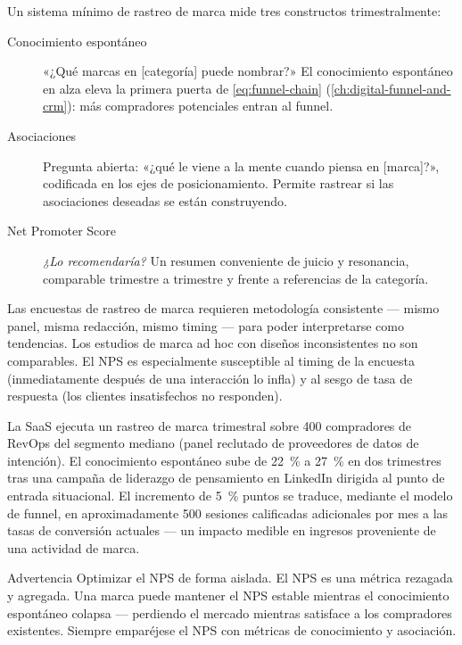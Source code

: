 Un sistema mínimo de rastreo de marca mide tres constructos trimestralmente:

\begin{description}
  \item[Conocimiento espontáneo] «¿Qué marcas en [categoría] puede nombrar?» El conocimiento espontáneo en alza eleva la primera puerta de \cref{eq:funnel-chain} (\cref{ch:digital-funnel-and-crm}): más compradores potenciales entran al funnel.
  \item[Asociaciones] Pregunta abierta: «¿qué le viene a la mente cuando piensa en [marca]?», codificada en los ejes de posicionamiento. Permite rastrear si las asociaciones deseadas se están construyendo.
  \item[Net Promoter Score] \emph{¿Lo recomendaría?} Un resumen conveniente de juicio y resonancia, comparable trimestre a trimestre y frente a referencias de la categoría.
\end{description}

Las encuestas de rastreo de marca requieren metodología consistente --- mismo panel, misma redacción, mismo timing --- para poder interpretarse como tendencias. Los estudios de marca ad hoc con diseños inconsistentes no son comparables. El NPS es especialmente susceptible al timing de la encuesta (inmediatamente después de una interacción lo infla) y al sesgo de tasa de respuesta (los clientes insatisfechos no responden).

\begin{example}
La SaaS ejecuta un rastreo de marca trimestral sobre 400 compradores de RevOps del segmento mediano (panel reclutado de proveedores de datos de intención). El conocimiento espontáneo sube de \qty{22}{\percent} a \qty{27}{\percent} en dos trimestres tras una campaña de liderazgo de pensamiento en LinkedIn dirigida al punto de entrada situacional. El incremento de \qty{5}{\percent} puntos se traduce, mediante el modelo de funnel, en aproximadamente 500 sesiones calificadas adicionales por mes a las tasas de conversión actuales --- un impacto medible en ingresos proveniente de una actividad de marca.
\end{example}

\begin{admonition}{Advertencia}
Optimizar el NPS de forma aislada. El NPS es una métrica rezagada y agregada. Una marca puede mantener el NPS estable mientras el conocimiento espontáneo colapsa --- perdiendo el mercado mientras satisface a los compradores existentes. Siempre emparéjese el NPS con métricas de conocimiento y asociación.
\end{admonition}

